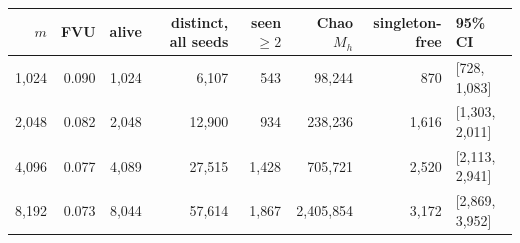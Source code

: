 \begin{tabular}{rrrrrrrl}
\toprule
$m$ & FVU & alive & distinct, all seeds & seen $\ge 2$ & Chao $M_h$ & singleton-free & 95\% CI \\
\midrule
1{,}024 & 0.090 & 1{,}024 & 6{,}107 & 543 & 98{,}244 & 870 & [728, 1{,}083] \\
2{,}048 & 0.082 & 2{,}048 & 12{,}900 & 934 & 238{,}236 & 1{,}616 & [1{,}303, 2{,}011] \\
4{,}096 & 0.077 & 4{,}089 & 27{,}515 & 1{,}428 & 705{,}721 & 2{,}520 & [2{,}113, 2{,}941] \\
8{,}192 & 0.073 & 8{,}044 & 57{,}614 & 1{,}867 & 2{,}405{,}854 & 3{,}172 & [2{,}869, 3{,}952] \\
\bottomrule
\end{tabular}
